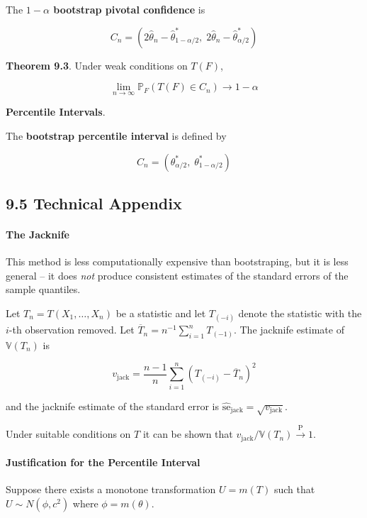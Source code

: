 The \textbf{\(1 - \alpha\) bootstrap pivotal confidence} is

\[ C_{n} = \left(2 \hat{\theta}_{n} - \hat{\theta}_{1 - \alpha/2}^*, \; 2 \hat{\theta}_{n} - \hat{\theta}_{\alpha/2}^* \right) \]

\textbf{Theorem 9.3}. Under weak conditions on \(T(F)\),

\[ \lim _{n \rightarrow \infty} \mathbb{P}_F\left(T(F) \in C_{n}\right) \rightarrow 1 - \alpha\]

\textbf{Percentile Intervals}.

The \textbf{bootstrap percentile interval} is defined by

\[ C_{n} = \left( \theta_{\alpha/2}^*, \; \theta_{1 - \alpha/2}^*\right) \]

\subsection*{9.5 Technical Appendix}

\paragraph{The Jacknife}\label{the-jacknife}

This method is less computationally expensive than bootstraping, but it
is less general -- it does \emph{not} produce consistent estimates of
the standard errors of the sample quantiles.

Let \(T_{n} = T(X_{1}, \dots, X_{n})\) be a statistic and let \(T_{(-i)}\)
denote the statistic with the \(i\)-th observation removed. Let
\(\overline{T}_{n} = n^{-1} \sum_{i=1}^{n} T_{(-1)}\). The jacknife estimate
of \(\mathbb{V}(T_{n})\) is

\[ v_\text{jack} = \frac{n - 1}{n} \sum_{i=1}^{n} \left(T_{(-i)} - \overline{T}_{n} \right)^{2} \]

and the jacknife estimate of the standard error is
\(\hat{\text{se}}_\text{jack} = \sqrt{v_\text{jack}}\).

Under suitable conditions on \(T\) it can be shown that
\(v_\text{jack} / \mathbb{V}(T_{n}) \xrightarrow{\text{P}} 1\).

\paragraph{Justification for the Percentile
Interval}\label{justification-for-the-percentile-interval}

Suppose there exists a monotone transformation \(U = m(T)\) such that
\(U \sim N(\phi, c^{2})\) where \(\phi = m(\theta)\).

